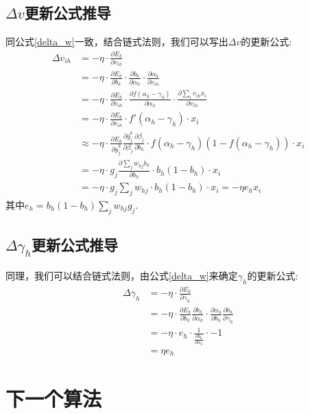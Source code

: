\documentclass[11pt]{report}
\begin{document}
\section{$\Delta v$更新公式推导}
同公式\ref{delta_w}一致，结合链式法则，我们可以写出$\Delta v$的更新公式:
\begin{equation}
	\label{delta_v}
	\begin{split}
		\Delta v_{ih}&=-\eta\cdot\frac{\partial E_k}{\partial v_{ih}}\\
		&=-\eta\cdot\frac{\partial E_k}{\partial b_k}\cdot\frac{\partial b_k}{\partial \alpha_h}\cdot\frac{\partial\alpha_h}{\partial v_{ih}}\\
		&=-\eta\cdot\frac{\partial E_k}{\partial v_{ih}}\cdot\frac{\partial f(\alpha_h-\gamma_h)}{\partial \alpha_h}\cdot \frac{\partial \sum_i v_{ih}x_i}{\partial v_{ih}}\\
		&=-\eta\cdot\frac{\partial E_k}{\partial v_{ih}}\cdot f'(\alpha_h-\gamma_h) \cdot x_i\\
		&\approx -\eta\cdot \frac{\partial E_k}{\partial \hat{y}_j^k}\frac{\partial \hat{y}_j^k}{\partial\beta_j}\frac{\partial\beta_j}{\partial b_h}\cdot f(\alpha_h-\gamma_h)(1-f(\alpha_h-\gamma_h))\cdot x_i\\
		&=-\eta\cdot g_j\frac{\partial\sum_j w_{hj}b_h}{\partial b_h}\cdot b_h(1-b_h)\cdot x_i\\
		&=-\eta\cdot g_j\sum_j w_{hj}\cdot b_h(1-b_h)\cdot x_i
		=-\eta e_h x_i
	\end{split}
\end{equation}
其中$e_h=b_h(1-b_h)\sum_j w_{hj}g_j$.
\section{$\Delta \gamma_h$更新公式推导}
同理，我们可以结合链式法则，由公式\ref{delta_w}来确定$\gamma_h$的更新公式:
\begin{equation}
	\label{gamma_h}
	\begin{split}
		\Delta \gamma_h &=-\eta\cdot \frac{\partial E_k}{\partial \gamma_h}\\
		&=-\eta\cdot \frac{\partial E_k}{\partial b_h}\frac{\partial b_h}{\partial \alpha_h}\cdot \frac{\partial \alpha_h}{\partial b_h} \frac{\partial b_h}{\partial\gamma_h}\\
		&=-\eta\cdot e_h\cdot \frac{1}{\frac{\partial b_h}{\partial \alpha_h}}\cdot -1 \\
		&=\eta e_h 
	\end{split}
\end{equation}

\chapter{下一个算法}

































 
\end{document}
